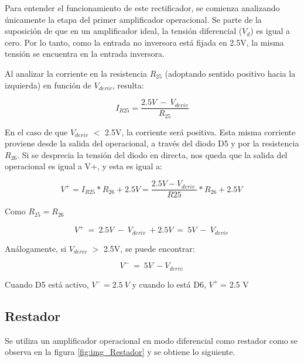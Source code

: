 \noindent Para entender el funcionamiento de este rectificador, se comienza analizando \'{u}nicamente la etapa del primer amplificador operacional. Se parte de la suposici\'{o}n de que en un amplificador ideal, la tensi\'{o}n diferencial ($V_d$) es igual a cero. Por lo tanto, como la entrada no inversora est\'{a} fijada en 2.5V, la misma tensi\'{o}n se encuentra en la entrada inversora.

\noindent Al analizar la corriente en la resistencia $R_{25}$ (adoptando sentido positivo hacia la izquierda) en funci\'{o}n de $V_{deriv}$, resulta:

\begin{equation} \label{eq_corriente_r25}
	I_{R25}=\frac{2.5V\ -\ V_{deriv}}{R_{25}}
\end{equation}

\noindent En el caso de que $V_{deriv}$ $\mathrm{<}$ 2.5V, la corriente ser\'{a} positiva. Esta misma corriente proviene desde la salida del operacional, a trav\'{e}s del diodo D5 y por la resistencia $R_{26}$. Si se desprecia la tensi\'{o}n del diodo en directa, nos queda que la salida del operacional es igual a V+, y esta es igual a:

\begin{equation} \label{eq_V+}
	V^+=I_{R25}*R_{26}+2.5V=\frac{2.5V-V_{deriv}\ }{R25}*R_{26}+2.5V\ 
\end{equation} 

Como $R_{25}=R_{26}$

\begin{equation} \label{eq_V+_2}
	V^+\ =\ 2.5V\ -\ V_{deriv}\ +2.5V\ =\ 5V\ -\ V_{deriv}\ 
\end{equation}

An\'{a}logamente, si $V_{deriv}$ $\mathrm{>}$ 2.5V, se puede encontrar:

\begin{equation} \label{eq_V+_3}
	V^-\ =\ {5V\ -V}_{deriv}\ 
\end{equation}

Cuando D5 est\'{a} activo, $V^-=2.5\ V$ y cuando lo est\'{a} D6, $V^+\ $= 2.5 V

\subsection{Restador}

\noindent Se utiliza un amplificador operacional en modo diferencial como restador como se observa en la figura \ref{fig:img_Restador} y se obtiene lo siguiente.

